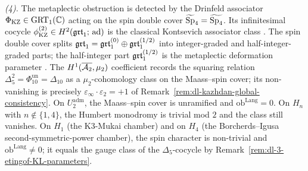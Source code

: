 \begin{remark}
\emph{(4).} The metaplectic obstruction is detected by the
Drinfeld associator $\Phi_{\mathrm{KZ}}\in\mathrm{GRT}_1(\mathbb{C})$ acting
on the spin double cover $\widetilde{\mathrm{Sp}}_4=\widetilde{\mathrm{Sp}_4}$. Its
infinitesimal cocycle
$\phi^{(2)}_{\mathrm{KZ}}\in H^2(\mathfrak{grt}_1;\,\mathrm{ad})$ is the
classical Kontsevich associator class
\cite[\S 4]{Drinfeld1990}. The spin double cover splits
$\mathfrak{grt}_1=\mathfrak{grt}_1^{(0)}\oplus\mathfrak{grt}_1^{(1/2)}$ into integer-graded and
half-integer-graded parts; the half-integer part
$\mathfrak{grt}_1^{(1/2)}$ is the metaplectic deformation parameter
\cite[\S 5]{EnriquezEtingof2005}. The $H^1(\overline{\mathcal{A}_2},\mu_2)$
coefficient records the squaring relation
$\Delta_5^2=\Phi_{10}^{\mathrm{un}}=\Delta_{10}$ as a
$\mu_2$-cohomology class on the
Maass--spin cover; its non-vanishing is precisely
$\varepsilon_\infty\cdot\varepsilon_2=+1$ of
Remark~\textup{\ref{rem:dl-kazhdan-global-consistency}}.
On $U_2^{\mathrm{adm}}$, the Maass--spin cover is unramified and
$\mathrm{ob}^{\mathrm{Lang}}=0$. On $H_n$ with
$n\not\in\{1,4\}$, the Humbert monodromy is trivial mod $2$ and the
class still vanishes. On $H_1$ (the K3-Mukai chamber) and on
$H_4$ (the Borcherds--Igusa second-symmetric-power chamber), the
spin character is non-trivial and
$\mathrm{ob}^{\mathrm{Lang}}\ne 0$; it equals the gauge class of the
$\Delta_5$-cocycle by Remark~\ref{rem:dl-3-etingof-KL-parameters}.
\end{remark}

